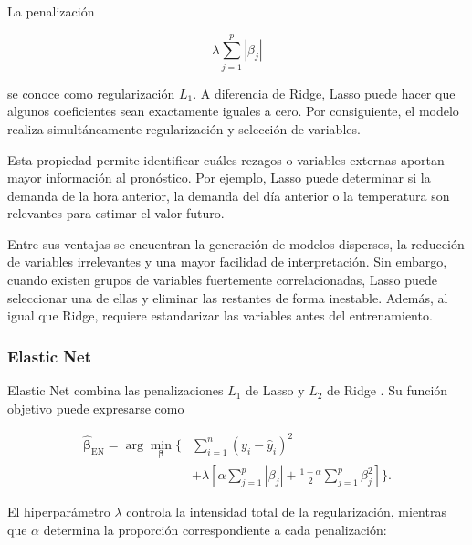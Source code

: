 La penalización

\begin{equation}
    \lambda
    \sum_{j=1}^{p}
    \left|
        \beta_j
    \right|
\end{equation}

se conoce como regularización $L_1$. A diferencia de Ridge, Lasso puede hacer que algunos coeficientes sean exactamente iguales a cero. Por consiguiente, el modelo realiza simultáneamente regularización y selección de variables.

Esta propiedad permite identificar cuáles rezagos o variables externas aportan mayor información al pronóstico. Por ejemplo, Lasso puede determinar si la demanda de la hora anterior, la demanda del día anterior o la temperatura son relevantes para estimar el valor futuro.

Entre sus ventajas se encuentran la generación de modelos dispersos, la reducción de variables irrelevantes y una mayor facilidad de interpretación. Sin embargo, cuando existen grupos de variables fuertemente correlacionadas, Lasso puede seleccionar una de ellas y eliminar las restantes de forma inestable. Además, al igual que Ridge, requiere estandarizar las variables antes del entrenamiento.

\subsubsection{Elastic Net}
\label{sec:elastic_net}

Elastic Net combina las penalizaciones $L_1$ de Lasso y $L_2$ de Ridge \cite{zou2005elastic}. Su función objetivo puede expresarse como

\begin{equation}
\begin{split}
    \hat{\boldsymbol{\beta}}_{\mathrm{EN}}
    =
    \arg\min_{\boldsymbol{\beta}}
    \Bigg\{
        &
        \sum_{i=1}^{n}
        \left(
            y_i-\hat{y}_i
        \right)^2
        \\
        &+
        \lambda
        \left[
            \alpha
            \sum_{j=1}^{p}
            \left|
                \beta_j
            \right|
            +
            \frac{1-\alpha}{2}
            \sum_{j=1}^{p}
            \beta_j^2
        \right]
    \Bigg\}.
\end{split}
\end{equation}

El hiperparámetro $\lambda$ controla la intensidad total de la regularización, mientras que $\alpha$ determina la proporción correspondiente a cada penalización:

